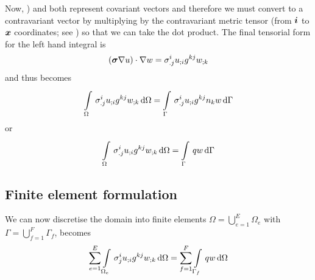 Now, ) and 
both represent covariant vectors and therefore we must convert  to a contravariant vector by 
multiplying by the contravariant metric tensor (from $ \boldsymbol{i} $ to $ \boldsymbol{x} $ 
coordinates; see )
so that we can take the dot product. The final tensorial form for the left
hand integral is
\begin{equation}
  \dotprod{\pbrac{\conductivitytensor\gradient{}{u}}}{\gradient{}{w}} = 
  \conductivitytensorsymbol^{i}_{.j}\covarderiv{u}{i}\generalmetrictensorsymbol^{kj}\covarderiv{w}{k}
\end{equation}
and thus  becomes
\begin{equation}
  \gint{\Omega}{}{\conductivitytensorsymbol^{i}_{.j}\covarderiv{u}{i}\generalmetrictensorsymbol^{kj}\covarderiv{w}{k}}{\Omega}
  = \gint{\Gamma}{}{\conductivitytensorsymbol^{i}_{.j}\covarderiv{u}{i}\generalmetrictensorsymbol^{kj}n_{k}w}{\Gamma}
  \label{eqn:LaplaceWeightedResidualTensorForm1}
\end{equation}
or
\begin{equation}
  \gint{\Omega}{}{\conductivitytensorsymbol^{i}_{.j}\covarderiv{u}{i}\generalmetrictensorsymbol^{kj}\covarderiv{w}{k}}{\Omega}
  = \gint{\Gamma}{}{qw}{\Gamma}
  \label{eqn:LaplaceWeightedResidualTensorForm2}
\end{equation}

\subsection{Finite element formulation}

We can now discretise the domain into finite elements \ie $\Omega=
\displaystyle{\bigcup_{e=1}^{E}}\Omega_{e}$ with
$\Gamma=\displaystyle{\bigcup_{f=1}^{F}}\Gamma_{f}$, 
 becomes
\begin{equation}
  \dsum_{e=1}^{E}\gint{\Omega_{e}}{}{\conductivitytensorsymbol^{i}_{j}\covarderiv{u}{i}\generalmetrictensorsymbol^{kj}
    \covarderiv{w}{k}}{\Omega}
  =\dsum_{f=1}^{F}\gint{\Gamma_{f}}{}{qw}{\Omega}
\end{equation}

